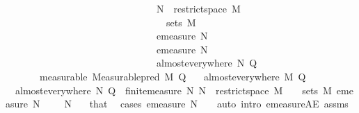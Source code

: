 \begin{isabellebody}
\ \ \ \ \ \ \ \ \ \ \ \ \ \ \ \ \ \ \ \ \ \ \ \ \ \ \ \ \ \ {\isasymLongrightarrow}\ N\ {\isacharequal}{\kern0pt}\ restrict{\isacharunderscore}{\kern0pt}space\ M\ {\isasymOmega}\isanewline
\ \ \ \ \ \ \ \ \ \ \ \ \ \ \ \ \ \ \ \ \ \ \ \ \ \ \ \ \ \ {\isasymLongrightarrow}\ {\isasymOmega}\ {\isasymin}\ sets\ M\ \isanewline
\ \ \ \ \ \ \ \ \ \ \ \ \ \ \ \ \ \ \ \ \ \ \ \ \ \ \ \ \ \ {\isasymLongrightarrow}\ emeasure\ N\ {\isasymOmega}\ {\isasymnoteq}\ {\isasyminfinity}\ \isanewline
\ \ \ \ \ \ \ \ \ \ \ \ \ \ \ \ \ \ \ \ \ \ \ \ \ \ \ \ \ \ {\isasymLongrightarrow}\ emeasure\ N\ {\isasymOmega}\ {\isasymnoteq}\ {}\ \isanewline
\ \ \ \ \ \ \ \ \ \ \ \ \ \ \ \ \ \ \ \ \ \ \ \ \ \ \ \ \ \ {\isasymLongrightarrow}\ almost{\isacharunderscore}{\kern0pt}everywhere\ N\ Q{\isachardoublequoteclose}\isanewline
\ \ \ \ \ \ \ {\isacharbrackleft}{\kern0pt}measurable{\isacharbrackright}{\kern0pt}{\isacharcolon}{\kern0pt}\ {\isachardoublequoteopen}Measurable{\isachardot}{\kern0pt}pred\ M\ Q{\isachardoublequoteclose}\isanewline
\ \ \ {\isachardoublequoteopen}almost{\isacharunderscore}{\kern0pt}everywhere\ M\ Q{\isachardoublequoteclose}\isanewline
%
\isadelimproof
%
\endisadelimproof
%
\isatagproof
{}\isamarkupfalse%
\ {\isacharminus}{\kern0pt}\isanewline
\ \ \isamarkupfalse%
\ {\isacharasterisk}{\kern0pt}{\isacharcolon}{\kern0pt}\ {\isachardoublequoteopen}almost{\isacharunderscore}{\kern0pt}everywhere\ N\ Q{\isachardoublequoteclose}\ \ {\isachardoublequoteopen}finite{\isacharunderscore}{\kern0pt}measure\ N{\isachardoublequoteclose}\ {\isachardoublequoteopen}N\ {\isacharequal}{\kern0pt}\ restrict{\isacharunderscore}{\kern0pt}space\ M\ {\isasymOmega}{\isachardoublequoteclose}\ {\isachardoublequoteopen}{\isasymOmega}\ {\isasymin}\ sets\ M{\isachardoublequoteclose}\ {\isachardoublequoteopen}emeasure\ N\ {\isasymOmega}\ {\isasymnoteq}\ {\isasyminfinity}{\isachardoublequoteclose}\ \ N\ {\isasymOmega}\ \isamarkupfalse%
\ that\ \isamarkupfalse%
\ {\isacharparenleft}{\kern0pt}cases\ {\isachardoublequoteopen}emeasure\ N\ {\isasymOmega}\ {\isacharequal}{\kern0pt}\ {}{\isachardoublequoteclose}{\isacharcomma}{\kern0pt}\ auto\ intro{\isacharcolon}{\kern0pt}\ emeasure{\isacharunderscore}{\kern0pt}{}{\isacharunderscore}{\kern0pt}AE\ assms{\isacharparenleft}{\kern0pt}{}{\isacharparenright}{\kern0pt}{\isacharparenright}{\kern0pt}\isanewline
\isanewline
\ \ \isamarkupfalse%

\end{isabellebody}
